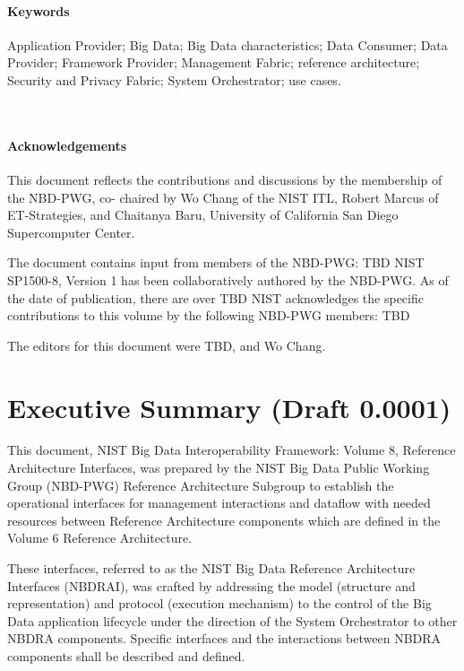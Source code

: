 \documentclass[11pt]{article}
\begin{document}
\paragraph{Keywords}

Application Provider; Big Data; Big Data characteristics; Data Consumer; Data Provider; Framework 
Provider; Management Fabric; reference architecture; Security and Privacy Fabric; System Orchestrator; 
use cases. 

 
\paragraph{Acknowledgements}

This document reflects the contributions and discussions by the membership of the NBD-PWG, co-
chaired by Wo Chang of the NIST ITL, Robert Marcus of ET-Strategies, and Chaitanya Baru, University 
of California San Diego Supercomputer Center. 

The document contains input from members of the NBD-PWG: TBD
NIST SP1500-8, Version 1 has been collaboratively authored by the NBD-PWG. As of the date of 
publication, there are over TBD
NIST acknowledges the specific contributions  to this volume by the following NBD-PWG members:
TBD

The editors for this document were TBD, and Wo Chang.

\newpage
{}

\section{Executive Summary (Draft 0.0001)}

This document, NIST Big Data Interoperability Framework: Volume 8, Reference Architecture Interfaces, 
was prepared by the NIST Big Data Public Working Group (NBD-PWG) Reference Architecture 
Subgroup to establish the operational interfaces for management interactions and dataflow with needed 
resources between Reference Architecture components which are defined in the Volume 6 Reference 
Architecture. 

These interfaces, referred to as the NIST Big Data Reference Architecture Interfaces (NBDRAI), was 
crafted by addressing the model (structure and representation) and protocol (execution mechanism) to the 
control of the Big Data application lifecycle under the direction of the System Orchestrator to other 
NBDRA components. Specific interfaces and the interactions between NBDRA components shall be 
described and defined.
\end{document}

